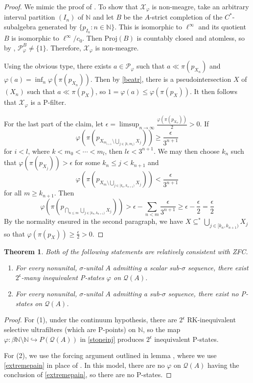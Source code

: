 \documentclass[10pt]{amsart}
\newtheorem{thm}{Theorem}[section]
\theoremstyle{definition}
\newcommand{\Proj}{\mathrm{Proj}}
\newcommand{\Pp}{\mathscr{P}_\varphi}
\newcommand{\Xp}{\mathscr{X}_\varphi}
\begin{document}
\begin{proof}
    We mimic the proof of \cite[6.2]{BI13}. To show that $\Xp$ is non-meagre, take an arbitrary interval partition $(I_n)$ of $\mathbb{N}$ and let $B$ be the $A$-strict completion of the $C^*$-subalgebra generated by $\{p_{I_n}:n\in\mathbb{N}\}$. This is isomorphic to $\ell^\infty$ and its quotient $B$ is isomorphic to $\ell^\infty/c_0$. Then $\Proj(B)$ is countably closed and atomless, so by \cite[6.1]{BI13}, $\Pp^B\neq\{1\}$. Therefore, $\Xp$ is non-meagre.

    Using the obvious type, there exists $a\in\Pp$ such that $a\ll \pi(p_{X_n})$ and $\varphi(a)=\inf_n\varphi(\pi(p_{X_n}))$. Then by \ref{beatr}, there is a pseudointersection $X$ of $(X_n)$ such that $a\ll\pi(p_X)$, so $1=\varphi(a)\leq\varphi(\pi(p_X))$. It then follows that $\Xp$ is a P-filter.

    For the last part of the claim, let $\epsilon=\limsup_{n\rightarrow\infty}\frac{\varphi(\pi(p_{X_n}))}{2}>0$. If \[\varphi(\pi(p_{X_{m_{i+1}}\setminus\bigcup_{j\in[k,m_i)}X_j}))\geq\frac{\epsilon}{3^{n+1}}\] for $i<l$, where $k<m_0<\cdots<m_l$, then $l\epsilon<3^{n+1}$. We may then choose $k_n$ such that $\varphi(\pi(p_{X_j}))>\epsilon$ for some $k_n\leq j< k_{n+1}$ and \[\varphi(\pi(p_{X_m\setminus\bigcup_{j\in[k_n,k_{n+1})}X_j}))<\frac{\epsilon}{3^{n+1}}\] for all $m\geq k_{n+1}$. Then
    \[\varphi(\pi(p_{\bigcap_{n\leq m}\bigcup_{j\in [k_n,k_{n+1})}X_j}))>\epsilon-\sum_{n<m}\frac{\epsilon}{3^{n+1}}\geq \epsilon -\frac{\epsilon}{2}=\frac{\epsilon}{2}\]
    By the normality ensured in the second paragraph, we have $X\subseteq^*\bigcup_{j\in[k_n,k_{n+1})}X_j$ so that $\varphi(\pi(p_X))\geq\frac{\epsilon}{2}>0$.
\end{proof}

\begin{thm}\label{corsat}
    Both of the following statements are relatively consistent with ZFC.
    \begin{enumerate}
        \item For every nonunital, $\sigma$-unital $A$ admitting a scalar sub-$\sigma$ sequence, there exist $2^\mathfrak{c}$-many inequivalent P-states $\varphi$ on $\mathscr{Q}(A)$.
        \item For every nonunital, $\sigma$-unital $A$ admitting a sub-$\sigma$ sequence, there exist no P-states on $\mathscr{Q}(A)$.
    \end{enumerate}
\end{thm}

\begin{proof}
    For (1), under the continuum hypothesis, there are $2^\mathfrak{c}$ RK-inequivalent selective ultrafilters (which are P-points) on $\mathbb{N}$, so the map $\varphi:\beta\mathbb{N}\setminus\mathbb{N}\hookrightarrow P(\mathscr{Q}(A))$ in \ref{stoneinj} produces $2^\mathfrak{c}$ inequivalent P-states.

    For (2), we use the forcing argument outlined in lemma \cite[6.5]{BI13}, where we use \ref{extremepain} in place of \cite[6.2]{BI13}. In this model, there are no $\varphi$ on $\mathscr{Q}(A)$ having the conclusion of \ref{extremepain}, so there are no P-states.
\end{proof}
\end{document}
